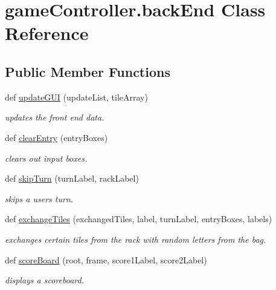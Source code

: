\hypertarget{classgame_controller_1_1back_end}{}\section{game\+Controller.\+back\+End Class Reference}
\label{classgame_controller_1_1back_end}
\subsection*{Public Member Functions}
\begin{DoxyCompactItemize}
\item 
def \hyperlink{classgame_controller_1_1back_end_a2ee0a55368a009401de29af9200424ee}{update\+G\+UI} (update\+List, tile\+Array)
\begin{DoxyCompactList}\small\item\em updates the front end data. \end{DoxyCompactList}\item 
def \hyperlink{classgame_controller_1_1back_end_a5c400fe1c0ba7d4ca57ce19e1de77903}{clear\+Entry} (entry\+Boxes)
\begin{DoxyCompactList}\small\item\em clears out input boxes. \end{DoxyCompactList}\item 
def \hyperlink{classgame_controller_1_1back_end_acca208cf314ba9075c598a917c3a9d77}{skip\+Turn} (turn\+Label, rack\+Label)
\begin{DoxyCompactList}\small\item\em skips a users turn. \end{DoxyCompactList}\item 
def \hyperlink{classgame_controller_1_1back_end_ad12f14e8b6277e0a7166311d230480cd}{exchange\+Tiles} (exchanged\+Tiles, label, turn\+Label, entry\+Boxes, labels)
\begin{DoxyCompactList}\small\item\em exchanges certain tiles from the rack with random letters from the bag. \end{DoxyCompactList}\item 
def \hyperlink{classgame_controller_1_1back_end_a5da56829420b20413e76aa7eb2857072}{score\+Board} (root, frame, score1\+Label, score2\+Label)
\begin{DoxyCompactList}\small\item\em displays a scoreboard. \end{DoxyCompactList}\item 

\end{DoxyCompactItemize}
